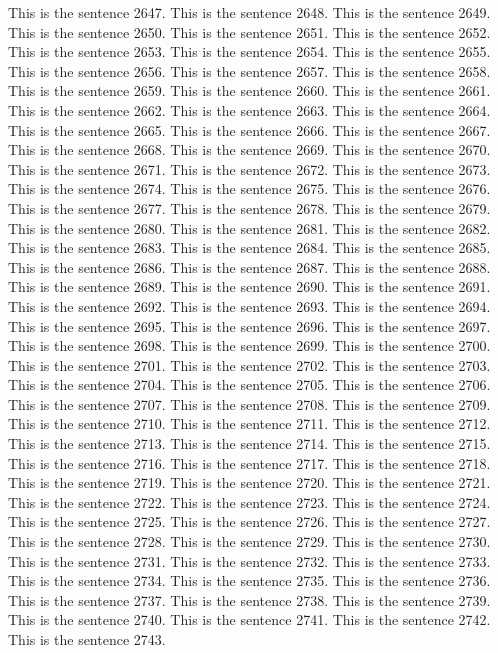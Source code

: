 \documentclass{article}
\begin{document}
This is the sentence 2647.
This is the sentence 2648.
This is the sentence 2649.
This is the sentence 2650.
This is the sentence 2651.
This is the sentence 2652.
This is the sentence 2653.
This is the sentence 2654.
This is the sentence 2655.
This is the sentence 2656.
This is the sentence 2657.
This is the sentence 2658.
This is the sentence 2659.
This is the sentence 2660.
This is the sentence 2661.
This is the sentence 2662.
This is the sentence 2663.
This is the sentence 2664.
This is the sentence 2665.
This is the sentence 2666.
This is the sentence 2667.
This is the sentence 2668.
This is the sentence 2669.
This is the sentence 2670.
This is the sentence 2671.
This is the sentence 2672.
This is the sentence 2673.
This is the sentence 2674.
This is the sentence 2675.
This is the sentence 2676.
This is the sentence 2677.
This is the sentence 2678.
This is the sentence 2679.
This is the sentence 2680.
This is the sentence 2681.
This is the sentence 2682.
This is the sentence 2683.
This is the sentence 2684.
This is the sentence 2685.
This is the sentence 2686.
This is the sentence 2687.
This is the sentence 2688.
This is the sentence 2689.
This is the sentence 2690.
This is the sentence 2691.
This is the sentence 2692.
This is the sentence 2693.
This is the sentence 2694.
This is the sentence 2695.
This is the sentence 2696.
This is the sentence 2697.
This is the sentence 2698.
This is the sentence 2699.
This is the sentence 2700.
This is the sentence 2701.
This is the sentence 2702.
This is the sentence 2703.
This is the sentence 2704.
This is the sentence 2705.
This is the sentence 2706.
This is the sentence 2707.
This is the sentence 2708.
This is the sentence 2709.
This is the sentence 2710.
This is the sentence 2711.
This is the sentence 2712.
This is the sentence 2713.
This is the sentence 2714.
This is the sentence 2715.
This is the sentence 2716.
This is the sentence 2717.
This is the sentence 2718.
This is the sentence 2719.
This is the sentence 2720.
This is the sentence 2721.
This is the sentence 2722.
This is the sentence 2723.
This is the sentence 2724.
This is the sentence 2725.
This is the sentence 2726.
This is the sentence 2727.
This is the sentence 2728.
This is the sentence 2729.
This is the sentence 2730.
This is the sentence 2731.
This is the sentence 2732.
This is the sentence 2733.
This is the sentence 2734.
This is the sentence 2735.
This is the sentence 2736.
This is the sentence 2737.
This is the sentence 2738.
This is the sentence 2739.
This is the sentence 2740.
This is the sentence 2741.
This is the sentence 2742.
This is the sentence 2743.
\end{document}
